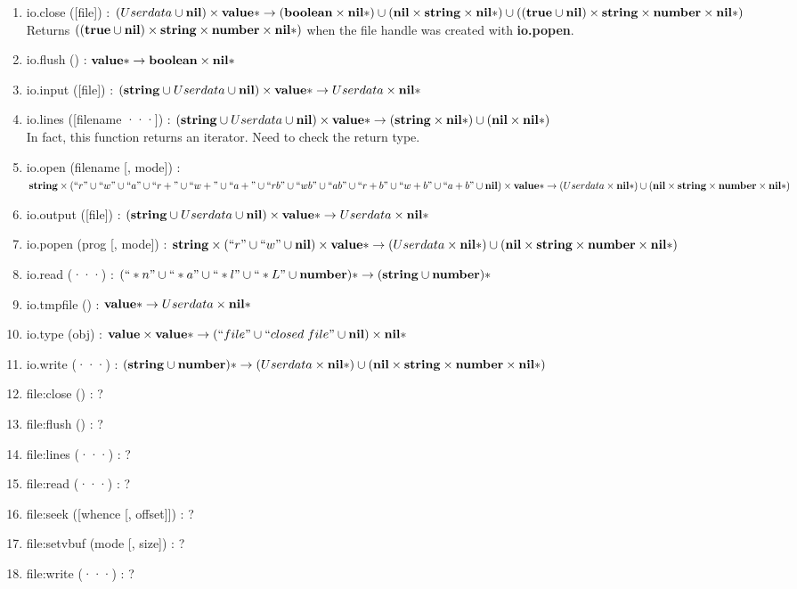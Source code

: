 \begin{enumerate}
\item io.close ([file]) :
$(Userdata \cup \mathbf{nil}) \times
\mathbf{value}{*} \rightarrow
(\mathbf{boolean} \times \mathbf{nil}{*}) \cup
(\mathbf{nil} \times \mathbf{string} \times \mathbf{nil}{*}) \cup
((\mathbf{true} \cup \mathbf{nil}) \times \mathbf{string} \times \mathbf{number} \times \mathbf{nil}{*})$
\\
Returns $((\mathbf{true} \cup \mathbf{nil}) \times \mathbf{string} \times \mathbf{number} \times \mathbf{nil}{*})$
when the file handle was created with \textbf{io.popen}.
\item io.flush () :
$\mathbf{value}{*} \rightarrow \mathbf{boolean} \times \mathbf{nil}{*}$
\item io.input ([file]) :
$(\mathbf{string} \cup Userdata \cup \mathbf{nil}) \times
\mathbf{value}{*} \rightarrow
Userdata \times
\mathbf{nil}{*}$
\item io.lines ([filename ···]) :
$(\mathbf{string} \cup Userdata \cup \mathbf{nil}) \times
\mathbf{value}{*} \rightarrow
(\mathbf{string} \times \mathbf{nil}{*}) \cup
(\mathbf{nil} \times \mathbf{nil}{*})$
\\
In fact, this function returns an iterator. Need to check the return type.
\item io.open (filename [, mode]) :
$\mathbf{string} \times
(``r" \cup ``w" \cup ``a" \cup
``r+" \cup ``w+" \cup ``a+" \cup
``rb" \cup ``wb" \cup ``ab" \cup
``r+b" \cup ``w+b" \cup ``a+b" \cup
\mathbf{nil}) \times
\mathbf{value}{*} \rightarrow
(Userdata \times \mathbf{nil}{*}) \cup
(\mathbf{nil} \times \mathbf{string} \times \mathbf{number} \times \mathbf{nil}{*})$
\item io.output ([file]) :
$(\mathbf{string} \cup Userdata \cup \mathbf{nil}) \times
\mathbf{value}{*} \rightarrow
Userdata \times
\mathbf{nil}{*}$
\item io.popen (prog [, mode]) :
$\mathbf{string} \times
(``r" \cup ``w" \cup \mathbf{nil}) \times
\mathbf{value}{*} \rightarrow
(Userdata \times \mathbf{nil}{*}) \cup
(\mathbf{nil} \times \mathbf{string} \times \mathbf{number} \times \mathbf{nil}{*})$
\item io.read (···) :
$(``*n" \cup ``*a" \cup ``*l" \cup ``*L" \cup \mathbf{number}){*} \rightarrow
(\mathbf{string} \cup \mathbf{number}){*}
$
\item io.tmpfile () :
$\mathbf{value}{*} \rightarrow Userdata \times \mathbf{nil}{*}$
\item io.type (obj) :
$\mathbf{value} \times \mathbf{value}{*} \rightarrow (``file" \cup ``closed\;file" \cup \mathbf{nil}) \times \mathbf{nil}{*}$
\item io.write (···) :
$(\mathbf{string} \cup \mathbf{number}){*} \rightarrow
(Userdata \times \mathbf{nil}{*}) \cup
(\mathbf{nil} \times \mathbf{string} \times \mathbf{number} \times \mathbf{nil}{*})$
\item file:close () : ?
\item file:flush () : ?
\item file:lines (···) : ?
\item file:read (···) : ?
\item file:seek ([whence [, offset]]) : ?
\item file:setvbuf (mode [, size]) : ?
\item file:write (···) : ?
\end{enumerate}

